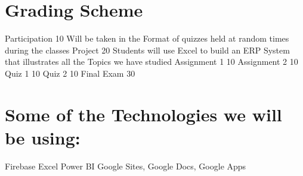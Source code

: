 \section * {   Grading Scheme }
    Participation       10%
      Will be taken in the Format of quizzes held at random times during the classes
    Project      20%
      Students will use Excel to build an ERP System that illustrates all the Topics we have studied
    Assignment 1  10%
    Assignment 2 10%
    Quiz 1  10%
    Quiz 2  10%
    Final Exam       30%
\section * {  Some of the Technologies we will be using:}
    Firebase
    Excel
    Power BI
    Google Sites, Google Docs, Google Apps
